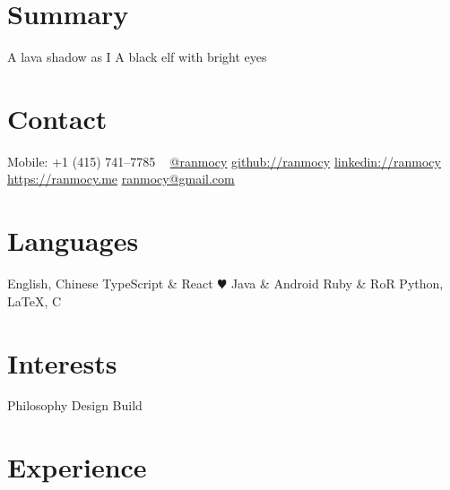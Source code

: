 \documentclass[]{friggeri-cv} %
\begin{document}


\begin{aside} %
  \section{Summary}
  A lava shadow as I
  A black elf
  with bright eyes
  \section{Contact}
  Mobile:
  +1 (415) 741--7785
  ~
  \href{https://twitter.com/ranmocy}{@ranmocy}
  \href{https://github.com/ranmocy}{github://ranmocy}
  \href{https://www.linkedin.com/in/ranmocy}{linkedin://ranmocy}
  \href{https://ranmocy.me}{https://ranmocy.me}
  \href{mailto:ranmocy+cv@gmail.com}{ranmocy@gmail.com}
  \section{Languages}
  English, Chinese
  TypeScript \& React {\color{red} $\varheartsuit$}
  Java \& Android
  Ruby \& RoR
  Python, LaTeX, C
  \section{Interests}
  Philosophy
  Design
  Build
\end{aside}


\section{Experience}
\end{document}
